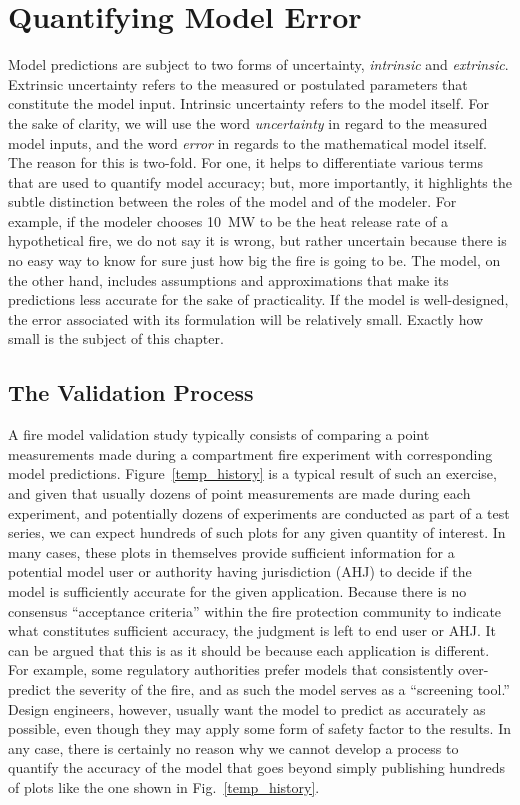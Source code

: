 
\chapter{Quantifying Model Error}

Model predictions are subject to two forms of uncertainty, {\em intrinsic} and {\em extrinsic}. Extrinsic uncertainty refers to the measured or postulated parameters that constitute the
model input. Intrinsic uncertainty refers to the model itself.
For the sake of clarity, we will use the word {\em uncertainty} in regard to the measured model inputs, and the word {\em error} in regards to the mathematical model itself.
The reason for this is two-fold. For one,
it helps to differentiate various terms that are used to quantify model accuracy; but, more importantly, it highlights the subtle distinction between the roles of the model
and of the modeler. For example, if the modeler chooses 10~MW to be the heat release rate of a hypothetical fire, we do not say it is wrong, but rather uncertain because there
is no easy way to know for sure just how big the fire is going to be. The model, on the other hand, includes assumptions and approximations that make its predictions less
accurate for the sake of practicality. If the model is well-designed, the error associated with its formulation will be relatively small. Exactly how small is the subject of
this chapter.

\section{The Validation Process}

A fire model validation study typically consists of comparing a point measurements made during a compartment fire experiment with corresponding model predictions.
Figure~\ref{temp_history} is a typical result of such an exercise, and given that usually dozens of point measurements are made during each experiment,
and potentially dozens of experiments are conducted as part of a test series, we can expect hundreds of such plots for any given quantity of interest. In many cases, these
plots in themselves provide sufficient information for a potential model user or authority having jurisdiction (AHJ) to decide if the model is sufficiently accurate for the
given application. Because there is no consensus ``acceptance criteria'' within the fire protection community to indicate what constitutes sufficient accuracy, the
judgment is left to end user or AHJ. It can be argued that this is as it should be because each application is different. For example, some regulatory
authorities prefer models that consistently over-predict the severity of the fire, and as such the model serves as a ``screening tool.'' Design engineers, however,
usually want the model to predict as accurately as possible, even though they may apply some form of safety factor to the results.
In any case, there is certainly no reason why we cannot develop a process to quantify the accuracy of the model that goes beyond simply
publishing hundreds of plots like the one shown in Fig.~\ref{temp_history}.

